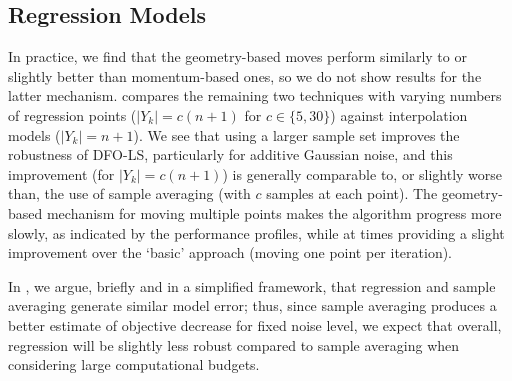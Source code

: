 \subsection{Regression Models} \label{sec_regression_results}
In practice, we find that the geometry-based moves perform similarly to or slightly better than momentum-based ones, so we do not show results for the latter mechanism.  compares the remaining two techniques
 with varying numbers of regression points ($|Y_k|=c(n+1)$ for $c\in\{5,30\}$) against interpolation models ($|Y_k|=n+1$).
We see that using a larger sample set improves the robustness of DFO-LS, particularly for additive Gaussian noise, and this improvement (for $|Y_k|=c(n+1)$) is generally comparable to, or slightly worse than, the use of sample averaging (with $c$ samples at each point).
The geometry-based mechanism for moving multiple points makes the algorithm progress more slowly, as indicated by the performance profiles, while at times providing a slight improvement over the `basic' approach (moving one point per iteration).

In , we argue, briefly and in a simplified framework, that regression and sample averaging generate similar model error;
thus, since sample averaging produces a better estimate of objective decrease 
for fixed noise level, we expect that overall, regression will be slightly less robust compared to sample averaging when
considering large computational budgets.  




